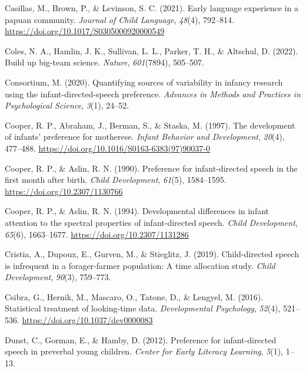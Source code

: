 \documentclass[
  ,man,floatsintext]{apa6}
\newlength{\cslhangindent}
\newlength{\cslentryspacingunit} %
\newenvironment{CSLReferences}[2] %
 {%
  \setlength{\parindent}{0pt}
  \ifodd #1
  \let\oldpar\par
  \def\par{\hangindent=\cslhangindent\oldpar}
  \fi
  \setlength{\parskip}{#2\cslentryspacingunit}
 }%
 {}
\begin{document}
\begin{CSLReferences}{1}{0}
\leavevmode{}%
Casillas, M., Brown, P., \& Levinson, S. C. (2021). Early language experience in a papuan community. \emph{Journal of Child Language}, \emph{48}(4), 792--814. \url{https://doi.org/10.1017/S0305000920000549}

\leavevmode{}%
Coles, N. A., Hamlin, J. K., Sullivan, L. L., Parker, T. H., \& Altschul, D. (2022). Build up big-team science. \emph{Nature}, \emph{601}(7894), 505--507.

\leavevmode{}%
Consortium, M. (2020). Quantifying sources of variability in infancy research using the infant-directed-speech preference. \emph{Advances in Methods and Practices in Psychological Science}, \emph{3}(1), 24--52.

\leavevmode{}%
Cooper, R. P., Abraham, J., Berman, S., \& Staska, M. (1997). The development of infants' preference for motherese. \emph{Infant Behavior and Development}, \emph{20}(4), 477--488. \url{https://doi.org/10.1016/S0163-6383(97)90037-0}

\leavevmode{}%
Cooper, R. P., \& Aslin, R. N. (1990). Preference for infant-directed speech in the first month after birth. \emph{Child Development}, \emph{61}(5), 1584--1595. \url{https://doi.org/10.2307/1130766}

\leavevmode{}%
Cooper, R. P., \& Aslin, R. N. (1994). Developmental differences in infant attention to the spectral properties of infant-directed speech. \emph{Child Development}, \emph{65}(6), 1663--1677. \url{https://doi.org/10.2307/1131286}

\leavevmode{}%
Cristia, A., Dupoux, E., Gurven, M., \& Stieglitz, J. (2019). Child-directed speech is infrequent in a forager-farmer population: A time allocation study. \emph{Child Development}, \emph{90}(3), 759--773.

\leavevmode{}%
Csibra, G., Hernik, M., Mascaro, O., Tatone, D., \& Lengyel, M. (2016). Statistical treatment of looking-time data. \emph{Developmental Psychology}, \emph{52}(4), 521--536. \url{https://doi.org/10.1037/dev0000083}

\leavevmode{}%
Dunst, C., Gorman, E., \& Hamby, D. (2012). Preference for infant-directed speech in preverbal young children. \emph{Center for Early Literacy Learning}, \emph{5}(1), 1--13.


\end{CSLReferences}
\end{document}

